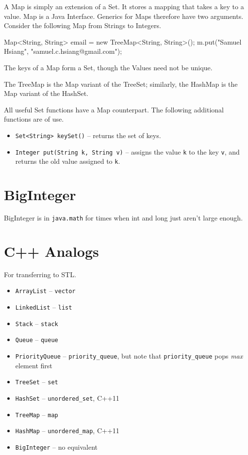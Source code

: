 \documentclass[11pt]{book}
\begin{document}
A Map is simply an extension of a Set. It stores a mapping that takes a key to a value. Map is a Java Interface. Generics for Maps therefore have two arguments. Consider the following Map from Strings to Integers.

\begin{mylstlisting}
Map<String, String> email = new TreeMap<String, String>();
m.put("Samuel Hsiang", "samuel.c.hsiang@gmail.com");
\end{mylstlisting}

The keys of a Map form a Set, though the Values need not be unique.

The TreeMap is the Map variant of the TreeSet; similarly, the HashMap is the Map variant of the HashSet.

All useful Set functions have a Map counterpart. The following additional functions are of use.

\begin{itemize}

\item
\texttt{Set<String> keySet()} -- returns the set of keys.

\item
\texttt{Integer put(String k, String v)} -- assigns the value \texttt{k} to the key \texttt{v}, and returns the old value assigned to \texttt{k}.

\end{itemize}

\section{BigInteger}

BigInteger is in \texttt{java.math} for times when int and long just aren't large enough.

\section{C++ Analogs}

For transferring to STL.

\begin{itemize}

\item \texttt{ArrayList} -- \texttt{vector}
\item \texttt{LinkedList} -- \texttt{list}
\item \texttt{Stack} -- \texttt{stack}
\item \texttt{Queue} -- \texttt{queue}
\item \texttt{PriorityQueue} -- \texttt{priority\_queue}, but note that \texttt{priority\_queue} pops \textit{max} element first
\item \texttt{TreeSet} -- \texttt{set}
\item \texttt{HashSet} -- \texttt{unordered\_set}, C++11
\item \texttt{TreeMap} -- \texttt{map}
\item \texttt{HashMap} -- \texttt{unordered\_map}, C++11
\item \texttt{BigInteger} -- no equivalent

\end{itemize}
\end{document}
